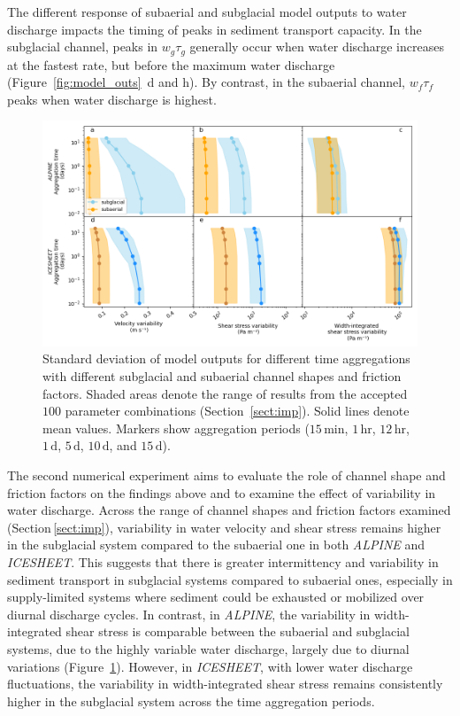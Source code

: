 \documentclass[draft]{agujournal2019}
\newcommand{\alpine}{\textit{ALPINE}}
\newcommand{\icesheet}{\textit{ICESHEET}}
\newcommand{\unit}[1]{$\mathrm{#1}$}
\begin{document}
The different response of subaerial and subglacial model outputs to water discharge impacts the timing of peaks in sediment transport capacity.
In the subglacial channel, peaks in $w_g\tau_g$ generally occur when water discharge increases at the fastest rate, but before the maximum water discharge (Figure~\ref{fig:model_outs}\, d and h).
By contrast, in the subaerial channel,   $w_f\tau_f$  peaks when water discharge is highest.

\begin{figure}[h]
  \centering
    \includegraphics[width=0.9\linewidth]{Fig4.png}
    \caption{Standard deviation of model outputs for different time aggregations with different subglacial and subaerial channel shapes and friction factors.
      Shaded areas denote the range of results from the accepted $100$ parameter combinations (Section~\ref{sect:imp}).
      Solid lines denote  mean values.
      Markers show aggregation periods ($15$\,\unit{min}, $1$\,\unit{hr}, $12$\,\unit{hr}, $1$\,\unit{d}, $5$\,\unit{d}, $10$\,\unit{d}, and $15$\,\unit{d}).
       }
    \label{fig:multi_run}
  \end{figure}

The second numerical experiment aims to evaluate the role of channel shape and friction factors on the findings above and to examine the effect of variability in water discharge.
Across the range of channel shapes and friction factors  examined (Section\,\ref{sect:imp}), variability in water velocity and shear stress remains higher in the subglacial system compared to the subaerial one in both \alpine{} and \icesheet{}.
This suggests that there is greater intermittency and variability in sediment transport in subglacial systems compared to subaerial ones, especially in supply-limited systems where sediment could be exhausted or mobilized over diurnal discharge cycles.
In contrast, in \alpine{}, the variability in width-integrated shear stress is comparable between the subaerial and subglacial systems, due to the highly variable water discharge, largely due to diurnal variations (Figure~\ref{fig:multi_run}).
However, in \icesheet{}, with lower water discharge fluctuations, the variability in width-integrated shear stress remains consistently higher in the subglacial system across the time aggregation periods.
\end{document}

